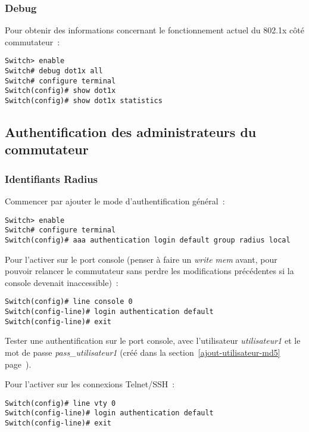 \subsubsection{Debug}

Pour obtenir des informations concernant le fonctionnement actuel du 802.1x côté commutateur~:

\begin{lstlisting}
Switch> enable
Switch# debug dot1x all
Switch# configure terminal
Switch(config)# show dot1x
Switch(config)# show dot1x statistics
\end{lstlisting}

\subsection{Authentification des administrateurs du commutateur}
\subsubsection{Identifiants Radius}

Commencer par ajouter le mode d'authentification général~:

\begin{lstlisting}
Switch> enable
Switch# configure terminal
Switch(config)# aaa authentication login default group radius local
\end{lstlisting}

Pour l'activer sur le port console (penser à faire un \emph{write mem} avant, pour pouvoir relancer le commutateur sans perdre les modifications précédentes si la console devenait inaccessible)~:

\begin{lstlisting}[morekeywords=0]
Switch(config)# line console 0
Switch(config-line)# login authentication default
Switch(config-line)# exit
\end{lstlisting}

Tester une authentification sur le port console, avec l'utilisateur \emph{utilisateur1} et le mot de passe \emph{pass\_utilisateur1} (créé dans la section~\ref{ajout-utilisateur-md5} page~\pageref{ajout-utilisateur-md5}). %

Pour l'activer sur les connexions Telnet/SSH~:

\begin{lstlisting}[morekeywords=0]
Switch(config)# line vty 0
Switch(config-line)# login authentication default
Switch(config-line)# exit
\end{lstlisting}

